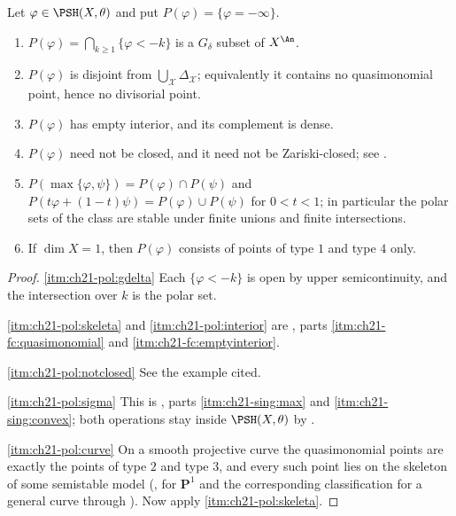 \begin{proposition}
\label{prop:ch21-polar-structure}
Let \(\varphi\in\PSH(X,\theta)\) and put \(P(\varphi)=\{\varphi=-\infty\}\).
\begin{enumerate}
\item\label{itm:ch21-pol:gdelta}
\(P(\varphi)=\bigcap_{k\geq1}\{\varphi<-k\}\) is a \(G_\delta\) subset of
\(X^{\An}\).
\item\label{itm:ch21-pol:skeleta}
\(P(\varphi)\) is disjoint from \(\bigcup_{\mathcal X}\Delta_{\mathcal X}\);
equivalently it contains no quasimonomial point, hence no divisorial point.
\item\label{itm:ch21-pol:interior}
\(P(\varphi)\) has empty interior, and its complement is dense.
\item\label{itm:ch21-pol:notclosed}
\(P(\varphi)\) need not be closed, and it need not be Zariski-closed; see
.
\item\label{itm:ch21-pol:sigma}
\(P(\max\{\varphi,\psi\})=P(\varphi)\cap P(\psi)\) and
\(P(t\varphi+(1-t)\psi)=P(\varphi)\cup P(\psi)\) for \(0<t<1\); in
particular the polar sets of the class are stable under finite unions and
finite intersections.
\item\label{itm:ch21-pol:curve}
If \(\dim X=1\), then \(P(\varphi)\) consists of points of type \(1\) and
type \(4\) only.
\end{enumerate}
\end{proposition}

\begin{proof}
\cref{itm:ch21-pol:gdelta}  Each \(\{\varphi<-k\}\) is open by upper
semicontinuity, and the intersection over \(k\) is the polar set.

\cref{itm:ch21-pol:skeleta} and \cref{itm:ch21-pol:interior} are
,
parts \cref{itm:ch21-fc:quasimonomial} and
\cref{itm:ch21-fc:emptyinterior}.

\cref{itm:ch21-pol:notclosed}  See the example cited.

\cref{itm:ch21-pol:sigma}  This is
,
parts \cref{itm:ch21-sing:max} and \cref{itm:ch21-sing:convex}; both
operations stay inside \(\PSH(X,\theta)\) by
.

\cref{itm:ch21-pol:curve}  On a smooth projective curve the quasimonomial
points are exactly the points of type \(2\) and type \(3\), and every such
point lies on the skeleton of some semistable model
(,
 for \(\mathbf P^1\) and the
corresponding classification for a general curve through
).  Now apply
\cref{itm:ch21-pol:skeleta}.
\end{proof}

